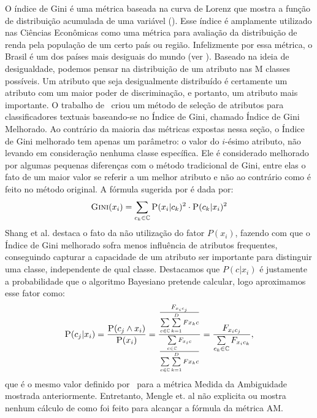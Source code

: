 O índice de Gini é uma métrica baseada na curva de Lorenz que mostra a função de distribuição acumulada de uma variável (\cite{Shang07}). Esse índice é amplamente utilizado nas Ciências Econômicas como uma métrica para avaliação da distribuição de renda pela população de um certo país ou região. Infelizmente por essa métrica, o Brasil é um dos países mais desiguais do mundo (ver \cite{cia-gini}). 
Baseado na ideia de desigualdade, podemos pensar na distribuição de um atributo nas M classes possíveis. Um atributo que seja desigualmente distribuído é certamente um atributo com um maior poder de discriminação, e portanto, um atributo mais importante. O trabalho de~\cite{Shang07} criou um método de seleção de atributos para classificadores textuais baseando-se no Índice de Gini, chamado Índice de Gini Melhorado. Ao contrário da maioria das métricas expostas nessa seção, o Índice de Gini melhorado tem apenas um parâmetro: o valor do $i$-ésimo atributo, não levando em consideração nenhuma classe específica. Ele é considerado melhorado por algumas pequenas diferenças com o método tradicional de Gini, entre elas o fato de um maior valor se referir a um melhor atributo e não ao contrário como é feito no método original. A fórmula sugerida por \cite{Shang07} é dada por:
\begin{equation}\label{eqn::gini}
 \textsc{Gini}(x_i) = \sum\limits_{c_k \in \mathbb{C}} \textsc{P}(x_i|c_k)^2 \cdot \textsc{P}(c_k|x_i)^2
\end{equation}
Shang et al. destaca o fato da não utilização do fator $P(x_i)$, fazendo com que o Índice de Gini melhorado sofra menos influência de atributos frequentes, conseguindo capturar a capacidade de um atributo ser importante para distinguir uma classe, independente de qual classe. Destacamos que $P(c|x_i)$ é justamente a probabilidade que o algoritmo Bayesiano pretende calcular, logo aproximamos esse fator como:
\begin{equation}\label{eqn::gini}
 \textsc{P}(c_j|x_i) = \frac{ \textsc{P}(c_j \wedge x_i) } {\textsc{P}(x_i) } = \frac{ \frac{ F_{x_ic_j}}{  \sum\limits_{c \in \mathbb{C}} \sum\limits_{k=1}^{D} {Fx_kc}  } } { \frac{\sum\limits_{c \in \mathbb{C}} F_{x_ic}}{ \sum\limits_{c \in \mathbb{C}} \sum\limits_{k=1}^{D} {Fx_kc}}} = \frac{ F_{x_{i}c_{j}}}{\sum\limits_{c_k \in \mathbb{C}} F_{x_{i}c_{k}}},
\end{equation}
que é o mesmo valor definido por~\cite{Mengle08} para a métrica Medida da Ambiguidade mostrada anteriormente. Entretanto, Mengle et. al não explicita ou mostra nenhum cálculo de como foi feito para alcançar a fórmula da métrica \textsc{AM}. 

